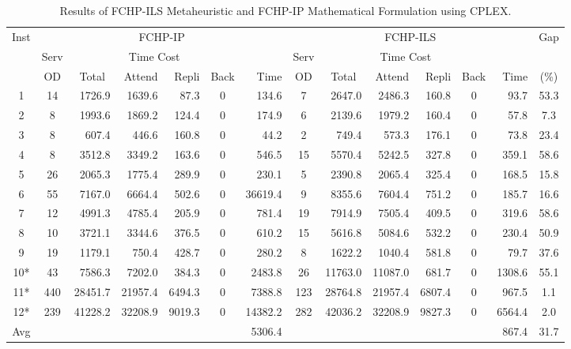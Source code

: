 \begin{table}[htp]
\scriptsize
\caption{Results of FCHP-ILS Metaheuristic and FCHP-IP Mathematical Formulation using CPLEX.}
\begin{center}
\setlength{\tabcolsep}{1mm}
\begin{tabular}{|c|crrrcr|crrrcr|c|}
\hline 
\multirow{3}{0.5cm}{Inst} & \multicolumn{6}{|c|}{FCHP-IP} & \multicolumn{6}{|c|}{FCHP-ILS} & Gap\\
\cline{2-13}
 & Serv & \multicolumn{4}{|c|}{Time Cost} & & Serv & \multicolumn{4}{|c|}{Time Cost} & & \\
 &  OD & \multicolumn{1}{|c}{Total} & Attend & Repli & \multicolumn{1}{c|}{Back} & Time & OD & \multicolumn{1}{|c}{Total} & Attend & Repli & \multicolumn{1}{c|}{Back} & Time & (\%)\\
\hline 
1	&	14	&	1726.9	&	1639.6	&	87.3	&	0	&	134.6	&	7	&	2647.0	&	2486.3	&	160.8	&	0	&	93.7	&	53.3	\\
2	&	8	&	1993.6	&	1869.2	&	124.4	&	0	&	174.9	&	6	&	2139.6	&	1979.2	&	160.4	&	0	&	57.8	&	7.3	\\
3	&	8	&	607.4	&	446.6	&	160.8	&	0	&	44.2	&	2	&	749.4	&	573.3	&	176.1	&	0	&	73.8	&	23.4	\\
4	&	8	&	3512.8	&	3349.2	&	163.6	&	0	&	546.5	&	15	&	5570.4	&	5242.5	&	327.8	&	0	&	359.1	&	58.6	\\
5	&	26	&	2065.3	&	1775.4	&	289.9	&	0	&	230.1	&	5	&	2390.8	&	2065.4	&	325.4	&	0	&	168.5	&	15.8	\\
6	&	55	&	7167.0	&	6664.4	&	502.6	&	0	&	36619.4	&	9	&	8355.6	&	7604.4	&	751.2	&	0	&	185.7	&	16.6	\\
7	&	12	&	4991.3	&	4785.4	&	205.9	&	0	&	781.4	&	19	&	7914.9	&	7505.4	&	409.5	&	0	&	319.6	&	58.6	\\
8	&	10	&	3721.1	&	3344.6	&	376.5	&	0	&	610.2	&	15	&	5616.8	&	5084.6	&	532.2	&	0	&	230.4	&	50.9	\\
9	&	19	&	1179.1	&	750.4	&	428.7	&	0	&	280.2	&	8	&	1622.2	&	1040.4	&	581.8	&	0	&	79.7	&	37.6	\\
10*	&	43	&	7586.3	&	7202.0	&	384.3	&	0	&	2483.8	&	26	&	11763.0	&	11087.0	&	681.7	&	0	&	1308.6	&	55.1	\\
11*	&	440	&	28451.7	&	21957.4	&	6494.3	&	0	&	7388.8	&	123	&	28764.8	&	21957.4	&	6807.4	&	0	&	967.5	&	1.1	\\
12*	&	239	&	41228.2	&	32208.9	&	9019.3	&	0	&	14382.2	&	282	&	42036.2	&	32208.9	&	9827.3	&	0	&	6564.4	&	2.0	\\
\hline
Avg	&		&		&		&		&		&	5306.4 	&		&		&		&		&		&	867.4 	&	31.7	\\
\hline 
\end{tabular}
\end{center}
\label{teorico}
\end{table}
	


